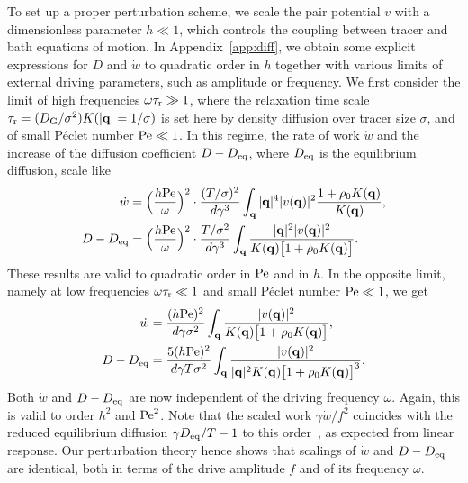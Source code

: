 \documentclass[pre, superscriptaddress, twocolumn,pre]{revtex4-1}
\begin{document}
To set up a proper perturbation scheme, we scale the pair potential $v$ with a dimensionless parameter $h\ll1$, which controls the coupling between tracer and bath equations of motion. In Appendix~\ref{app:diff}, we obtain some explicit expressions for $D$ and $\dot w$ to quadratic order in $h$ together with various limits of external driving parameters, such as amplitude or frequency. 
We first consider the limit of high frequencies $\omega\tau_{\rm r}\gg 1$, where the relaxation time scale $\tau_{\rm r}=(D_{\rm G}/\sigma^2)K(|{\bf q}|=1/\sigma)$ is set here by density diffusion over tracer size $\sigma$, and of small P\'eclet number ${\rm Pe}\ll 1$. In this regime, the rate of work $\dot w$ and the increase of the diffusion coefficient $D-D_{\rm eq}$, where $D_{\rm eq}$ is the equilibrium diffusion, scale like
\begin{equation}\label{eq:small}
	\begin{aligned}
		\dot w &= \Big(\frac{h{\rm Pe}}{\omega}\Big)^2 \cdot \frac{(T/\sigma)^2}{d\gamma^3} \int_{\bf q} |{\bf q}|^4 |v({\bf q})|^2 \frac{1 + \rho_0K({\bf q})}{K({\bf q})} ,
		\\
		D-D_{\rm eq} &= \Big(\frac{h{\rm Pe}}{\omega}\Big)^2 \cdot \frac{T /\sigma^2}{d\gamma^3} \int_{\bf q}\frac{|{\bf q}|^2 |v({\bf q})|^2 } {K({\bf q})\big[1 + \rho_0 K({\bf q})\big]} .
	\end{aligned}
\end{equation}
These results are valid to quadratic order in $\rm Pe$ and in $h$. In the opposite limit, namely at low frequencies $\omega\tau_{\rm r}\ll 1$ and small P\'eclet number ${\rm Pe}\ll1$, we get
\begin{equation}\label{eq:large}
	\begin{aligned}
		\dot w &=  \frac{(h{\rm Pe})^2}{d\gamma\sigma^2} \int_{\bf q} \frac{|v({\bf q})|^2}{K({\bf q})\big[1 + \rho_0K({\bf q})\big]} ,
		\\
		D - D_{\rm eq} &= \frac{5(h{\rm Pe})^2}{d\gamma T\sigma^2} \int_{\bf q} \frac{|v({\bf q})|^2}{|{\bf q}|^2K({\bf q})\big[1 + \rho_0K({\bf q})\big]^3} .
	\end{aligned}
\end{equation}
Both $\dot w$ and $D-D_{\rm eq}$ are now independent of the driving frequency $\omega$. Again, this is valid to order $h^2$ and ${\rm Pe}^2$. Note that the scaled work $\gamma\dot w/f^2$ coincides with the reduced equilibrium diffusion $\gamma D_{\rm eq}/T-1$ to this order~\cite{Demery2011, Demery2014}, as expected from linear response. Our perturbation theory hence shows that scalings of $\dot w$ and $D-D_{\rm eq}$ are identical, both in terms of the drive amplitude $f$ and of its frequency $\omega$.
\end{document}
